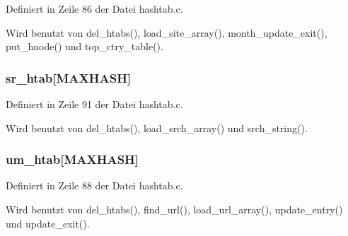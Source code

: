 Definiert in Zeile 86 der Datei hashtab.c.

Wird benutzt von del\_\-htabs(), load\_\-site\_\-array(), month\_\-update\_\-exit(), put\_\-hnode() und top\_\-ctry\_\-table().
\subsubsection{ {\bf sr\_\-htab}[MAXHASH]}\label{hashtab_8h_e9a8ef54a4b421e3d16dc313f162ccff}




Definiert in Zeile 91 der Datei hashtab.c.

Wird benutzt von del\_\-htabs(), load\_\-srch\_\-array() und srch\_\-string().
\subsubsection{ {\bf um\_\-htab}[MAXHASH]}\label{hashtab_8h_2f99d64abd1711a4b10ee71d070811a7}




Definiert in Zeile 88 der Datei hashtab.c.

Wird benutzt von del\_\-htabs(), find\_\-url(), load\_\-url\_\-array(), update\_\-entry() und update\_\-exit().